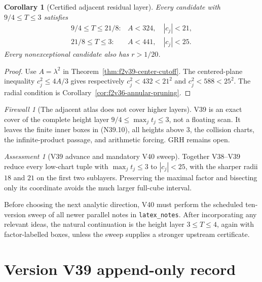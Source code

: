 \documentclass[11pt]{article}
\newtheorem{corollary}[theorem]{Corollary}
\theoremstyle{definition}
\theoremstyle{remark}
\newtheorem{assessment}[theorem]{Assessment}
\newtheorem{firewall}[theorem]{Firewall}
\begin{document}
\begin{corollary}[Certified adjacent residual layer]
\label{cor:f2v39-adjacent-layer}
Every candidate with \(9/4\leq T\leq3\) satisfies
\[
\boxed{
\begin{array}{ll}
9/4\leq T\leq21/8:&A<324,\quad |c_j|<21,\\
21/8\leq T\leq3:&A<441,\quad |c_j|<25.
\end{array}}
\tag{N39.10}
\]
Every nonexceptional candidate also has \(r>1/20\).
\end{corollary}

\begin{proof}
Use \(A=\lambda^2\) in
Theorem~\ref{thm:f2v39-center-cutoff}.  The centered-plane inequality
\(c_j^2\leq4A/3\) gives respectively
\(c_j^2<432<21^2\) and \(c_j^2<588<25^2\).  The radial condition is
Corollary~\ref{cor:f2v36-annular-pruning}.
\end{proof}

\begin{firewall}[The adjacent atlas does not cover higher layers]
\label{fire:f2v39}
V39 is an exact cover of the complete height layer
\(9/4\leq\max_jt_j\leq3\), not a floating scan.  It leaves the finite
inner boxes in \textup{(N39.10)}, all heights above \(3\), the collision
charts, the infinite-product passage, and arithmetic forcing.  GRH remains
open.
\end{firewall}

\begin{assessment}[V39 advance and mandatory V40 sweep]
\label{ass:f2v39}
Together V38--V39 reduce every low-chart tuple with
\(\max_jt_j\leq3\) to \(|c_j|<25\), with the sharper radii \(18\) and
\(21\) on the first two sublayers.  Preserving the maximal factor and
bisecting only its coordinate avoids the much larger full-cube interval.

Before choosing the next analytic direction, V40 must perform the scheduled
ten-version sweep of all newer parallel notes in \texttt{latex\_notes}.
After incorporating any relevant ideas, the natural continuation is the
height layer \(3\leq T\leq4\), again with factor-labelled boxes, unless the
sweep supplies a stronger upstream certificate.
\end{assessment}

\section*{Version V39 append-only record}
\end{document}
